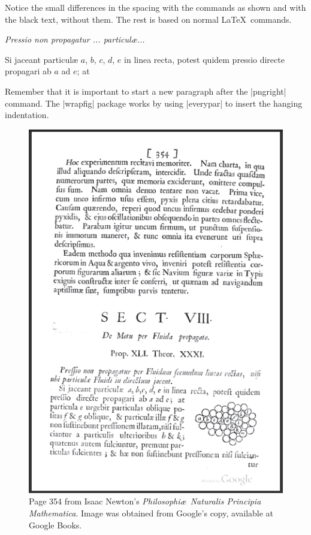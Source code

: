 \vspace*{-37pt}


Notice the small differences in the spacing with the commands as shown and with the black text, without them. The rest is based on normal \LaTeX\ commands.

\textit{Pressio non propagatur ... particul{\ae}...}


Si jaceant particul{\ae} $a$, $b$, $c$, $d$,
$e$ in linea recta, potest quidem
pressio directe propagari ab $a$ ad $e$; at


Remember that it is important to start a new paragraph after the 
|pngright| command. The |wrapfig| package works by using |everypar| to insert the hanging indentation.

\begin{figure}[p]
\centering
\includegraphics[scale=1]{images/page354}
\caption{Page 354 from Isaac Newton's \textit{Philosophi\ae\  Naturalis Principia Mathematica}. Image was obtained from Google's copy, available at Google Books.}
\label{fig:principia}
\end{figure}
